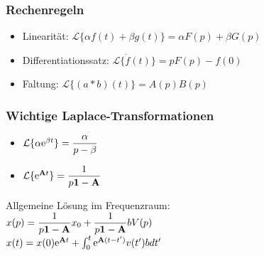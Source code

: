 \documentclass[fs, footer]{latex4ei}
\begin{document}
\begin{multicols*}{4}
\subsubsection{Rechenregeln}
\begin{itemize}
	\item Linearität: $\mathcal L\{\alpha f(t) + \beta g(t)\} = \alpha F(p) + \beta G(p)$
	\item Differentiationssatz: $\mathcal L\{\dot f(t)\} = pF(p) - f(0)$
	\item Faltung: $\mathcal L\{(a * b)(t)\} = A(p)B(p)$
\end{itemize}
\subsubsection{Wichtige Laplace-Transformationen}
\begin{itemize}
	\item $\mathcal L\{\alpha\mathrm{e}^{\beta t}\} = \dfrac{\alpha}{p-\beta}$
	\item $\mathcal L\{\mathrm{e}^{\textbf{A}t}\} = \dfrac{1}{p\textbf{1} - \textbf{A}}$
\end{itemize}
Allgemeine Lösung im Frequenzraum:\\
$x(p) = \dfrac{1}{p\textbf{1}-\textbf{A}}x_0 + \dfrac{1}{p\textbf{1}-\textbf{A}}bV(p)$\\
$x(t) = x(0)\mathrm{e}^{\textbf{A}t} + \int_0^t \mathrm{e}^{\textbf{A}(t-t')}v(t')b dt'$

\end{multicols*}
\end{document}
